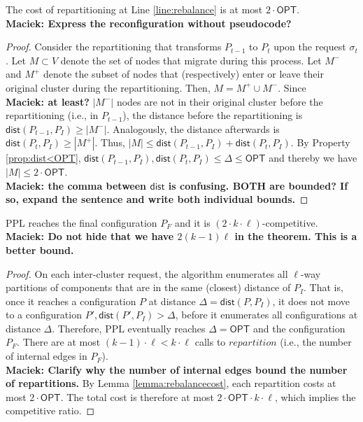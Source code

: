 \documentclass[manuscript,screen=true, review, anonymous]{acmart}
\newcommand{\OPT}{\textsf{OPT}\xspace}
\newcommand{\PPL}{\textsf{PPL}\xspace}
\newcommand{\dist}{\textsf{dist}}
\newcommand\mahmoud[1]{\color{orange}\textbf{\\ Mahmoud: #1}\\\color{black}}
\newcommand\maciek[1]{\color{brown}\textbf{\\ Maciek: #1}\color{black}}
\begin{document}
\begin{lemma}	\label{lemma:rebalancecost}
	The cost of repartitioning at Line \ref{line:rebalance} is at most $2\cdot\OPT$.
	\maciek{Express the reconfiguration without pseudocode?}
\end{lemma}
\begin{proof}
	Consider the repartitioning that transforms $P_{t-1}$ to $P_t$ upon the request $\sigma_t$.
	Let $M \subset V$ denote the set of nodes that migrate during this process.
	Let $M^-$ and $M^+$ denote the subset of nodes that (respectively)
	enter or leave their original cluster during the repartitioning.    
	Then,
	$M = M^+ \cup M^-$.
	Since \maciek{at least?} $|M^-|$ nodes are not in their original cluster before the repartitioning (i.e., in $P_{t-1}$),
	the distance before the repartitioning is $\dist(P_{t-1},P_I) \geq | M^-|$.
	Analogously,
	the distance afterwards is $\dist(P_{t},P_I) \geq | M^+|$.
	Thus,
	$|M| \leq \dist(P_{t-1},P_I) + \dist(P_{t},P_I)$.
	By Property \ref{prop:dist<OPT},
	$\dist(P_{t-1},P_I) , \dist(P_{t},P_I) \leq \Delta \leq \OPT$
	and thereby we have	
	$|M| \leq 2\cdot\OPT$.
	\maciek{the comma between $\dist$ is confusing. BOTH are bounded? If so, expand the sentence and write both individual bounds.}
\end{proof}

\begin{theorem}	\label{thm:upperbound}
	\PPL reaches the final configuration $P_F$ and it is $(2\cdot k\cdot\ell)$-competitive.
	\maciek{Do not hide that we have $2(k-1)\ell$ in the theorem. This is a better bound.}
\end{theorem}
\begin{proof}
	On each inter-cluster request,
	the algorithm enumerates all $\ell$-way partitions of components
	that are in the same (closest) distance of $P_I$.
	That is, 
	once it reaches a configuration $P$ at distance $\Delta = \dist(P, P_I)$,
	it does not move to a configuration
	$P', \dist(P', P_I) > \Delta$,
	before it enumerates all configurations at distance $\Delta$.
	Therefore,
	\PPL eventually reaches $\Delta=\OPT$ and the configuration $P_F$.
	There are at most $(k-1)\cdot\ell < k\cdot\ell $ calls   to $\mathit{repartition}$
	(i.e., the number of internal edges in $P_F$).
	\maciek{Clarify why the number of internal edges bound the number of repartitions.}
	By Lemma \ref{lemma:rebalancecost},
	each repartition costs at most $2\cdot\OPT$.
	The total cost is therefore at most $2\cdot\OPT\cdot k\cdot\ell$, which implies the competitive ratio.
\end{proof}
\end{document}
